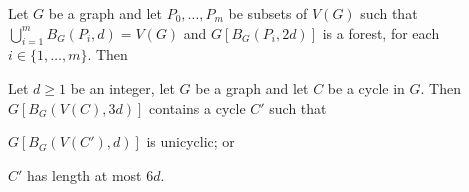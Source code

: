 \documentclass{patmorin}
\renewcommand{\ge}{\geqslant}
\begin{document}
\begin{lem}
  Let $G$ be a graph and let $P_0,\ldots,P_m$ be subsets of $V(G)$ such that
  $\bigcup_{i=1}^m B_G(P_i,d)=V(G)$ and
  $G[B_G(P_i,2d)]$ is a forest, for each $i\in\{1,\ldots,m\}$.  Then
\end{lem}





\begin{lem}
  Let $d\ge 1$ be an integer, let $G$ be a graph and let $C$ be a cycle in $G$.  Then $G[B_G(V(C),3d)]$ contains a cycle $C'$ such that
  \begin{compactenum}
    \item $G[B_G(V(C'),d)]$ is unicyclic; or
    \item $C'$ has length at most $6d$.
  \end{compactenum}
\end{lem}
\end{document}
